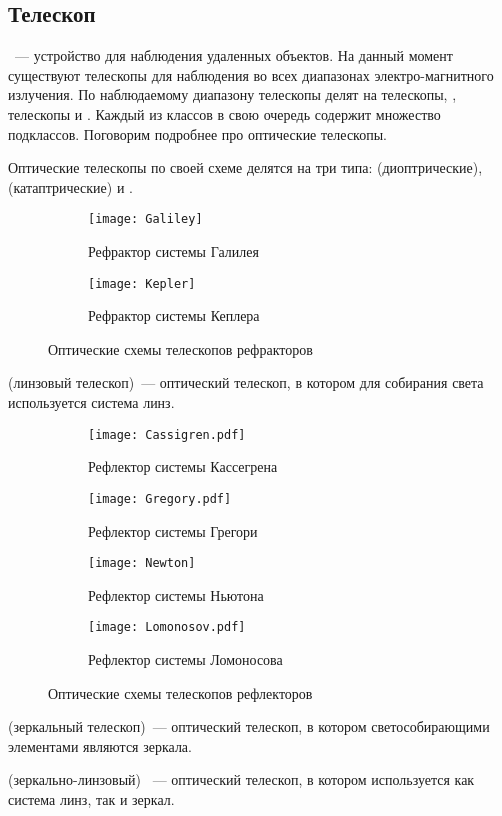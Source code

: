 \subsection{Телескоп}
~--- устройство для наблюдения удаленных объектов. На данный момент существуют телескопы  для наблюдения во всех  диапазонах электро-магнитного излучения. По наблюдаемому диапазону телескопы делят на  телескопы, ,  телескопы и . Каждый из классов в свою очередь содержит множество подклассов. Поговорим подробнее про оптические телескопы.

Оптические телескопы по своей схеме делятся на три типа:  (диоптрические),  (катаптрические) и .

\vspace{-.3pc}
\begin{figure}[h!]
	\centering
	\begin{subfigure}{0.49\tw}
		\texttt{[image: Galiley]}
		\caption{Рефрактор системы Галилея}
	\end{subfigure}
	\hfill
	\begin{subfigure}{0.49\tw}
		\texttt{[image: Kepler]}
		\caption{Рефрактор системы Кеплера}
		\label{Kepler}
	\end{subfigure}
	\caption{Оптические схемы телескопов рефракторов}
\end{figure}
 (линзовый телескоп)~---  оптический телескоп, в котором для собирания света используется система линз.

\vspace{-.3pc}
\begin{figure}[h!]
	\begin{subfigure}{0.49\tw}
		\texttt{[image: Cassigren.pdf]}
		\caption{Рефлектор системы Кассегрена}
	\end{subfigure}
	\hfill
	\begin{subfigure}{0.49\tw}
		\texttt{[image: Gregory.pdf]}
		\caption{Рефлектор системы Грегори}
		\label{Gregory}
	\end{subfigure}
	\vskip4pt
	\begin{subfigure}{0.49\tw}
		\texttt{[image: Newton]}
		\caption{Рефлектор системы Ньютона}
	\end{subfigure}
	\hfill
	\begin{subfigure}{0.49\tw}
		\texttt{[image: Lomonosov.pdf]}
		\caption{Рефлектор системы Ломоносова}
	\end{subfigure}
	\caption{Оптические схемы телескопов рефлекторов}
\end{figure}
 (зеркальный телескоп)~---  оптический телескоп,  в котором светособирающими элементами являются зеркала.

 (зеркально-линзовый) ~--- оптический телескоп, в котором используется как система линз, так и зеркал.
